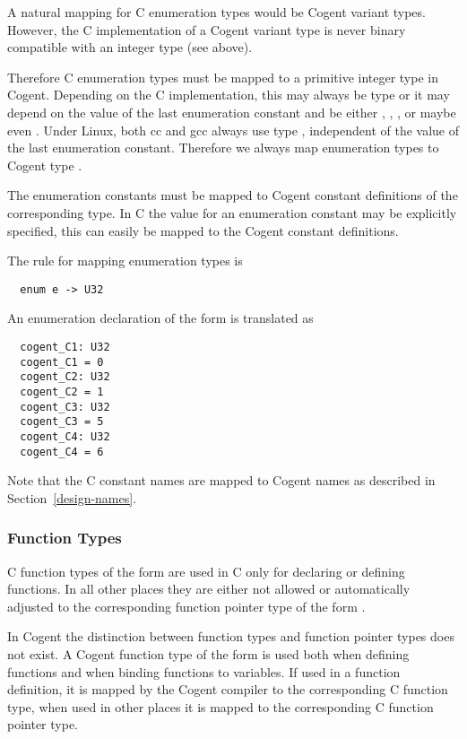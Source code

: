 A natural mapping for C enumeration types would be Cogent variant types. However, the C implementation
of a Cogent variant type is never binary compatible with an integer type (see above). 

Therefore C enumeration types must be mapped to a primitive integer type in Cogent. Depending on the C
implementation, this may always be type  or it may depend on the value of the last enumeration
constant and be either , , , or maybe even . Under Linux, both cc
and gcc always use type , independent of the value of the last enumeration constant. 
Therefore we always map enumeration types to Cogent type .

The enumeration constants must be mapped to Cogent constant definitions of the corresponding type. In 
C the value for an enumeration constant may be explicitly specified, this can easily be mapped to
the Cogent constant definitions.

The rule for mapping enumeration types is
\begin{verbatim}
  enum e -> U32
\end{verbatim}

An enumeration declaration of the form  is translated as
\begin{verbatim}
  cogent_C1: U32
  cogent_C1 = 0
  cogent_C2: U32
  cogent_C2 = 1
  cogent_C3: U32
  cogent_C3 = 5
  cogent_C4: U32
  cogent_C4 = 6
\end{verbatim}
Note that the C constant names are mapped to Cogent names as described in Section~\ref{design-names}.

\subsubsection{Function Types}
\label{design-types-function}

C function types of the form  are used in C only for declaring or defining functions. In all other
places they are either not allowed or automatically adjusted to the corresponding function pointer type
of the form . 

In Cogent the distinction between function types and function pointer types does not exist. 
A Cogent function type of the form  is used both when
defining functions and when binding functions to variables. If used in a function definition, it is mapped by
the Cogent compiler to the corresponding C function type, when used in other places it is mapped to the 
corresponding C function pointer type.

